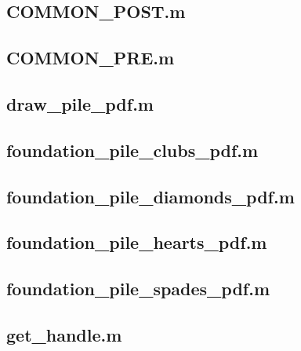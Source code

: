\documentclass[runningheads,a4paper]{llncs}
\newcommand{\GPenSIM}{../GPenSIM}
\begin{document}
\subsection{COMMON\_POST.m}
\label{app:COMMON_POST.m}


\subsection{COMMON\_PRE.m}
\label{app:COMMON_PRE.m}


\subsection{draw\_pile\_pdf.m}
\label{app:draw_pile_pdf.m}


\subsection{foundation\_pile\_clubs\_pdf.m}
\label{app:foundation_pile_clubs_pdf.m}


\subsection{foundation\_pile\_diamonds\_pdf.m}
\label{app:foundation_pile_diamonds_pdf.m}


\subsection{foundation\_pile\_hearts\_pdf.m}
\label{app:foundation_pile_hearts_pdf.m}


\subsection{foundation\_pile\_spades\_pdf.m}
\label{app:foundation_pile_spades_pdf.m}


\subsection{get\_handle.m}
\label{app:get_handle.m}

\end{document}
